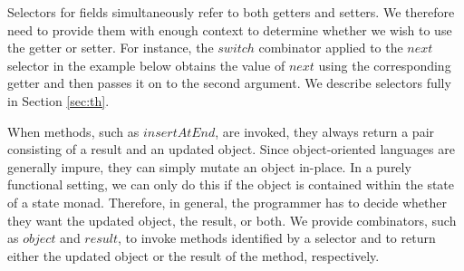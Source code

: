 Selectors for fields simultaneously refer to both getters and setters. We therefore need to provide them with enough context to determine whether we wish to use the getter or setter. For instance, the $\mathit{switch}$ combinator applied to the $\mathit{next}$ selector in the example below obtains the value of $\mathit{next}$ using the corresponding getter and then passes it on to the second argument. We describe selectors fully in Section \ref{sec:th}.

When methods, such as $\mathit{insertAtEnd}$, are invoked, they always return a pair consisting of a result and an updated object. Since object-oriented languages are generally impure, they can simply mutate an object in-place. In a purely functional setting, we can only do this if the object is contained within the state of a state monad. Therefore, in general, the programmer has to decide whether they want the updated object, the result, or both. We provide combinators, such as $\mathit{object}$ and $\mathit{result}$, to invoke methods identified by a selector and to return either the updated object or the result of the method, respectively.

